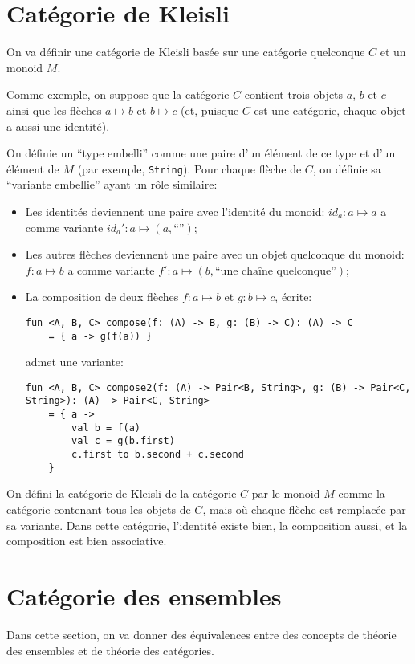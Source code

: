 \documentclass[a4paper,10pt,french,openany]{memoir}
\begin{document}
\section{Catégorie de Kleisli}

On va définir une catégorie de Kleisli basée sur une catégorie quelconque $C$ et un monoid $M$.

Comme exemple, on suppose que la catégorie $C$ contient trois objets $a$, $b$ et $c$ ainsi que les flèches $a \mapsto b$ et $b \mapsto c$ (et, puisque $C$ est une catégorie, chaque objet a aussi une identité).

On définie un ``type embelli'' comme une paire d'un élément de ce type et d'un élément de $M$ (par exemple, \lstinline{String}).
Pour chaque flèche de $C$, on définie sa ``variante embellie'' ayant un rôle similaire:
\begin{itemize}
 \item Les identités deviennent une paire avec l'identité du monoid: $id_a: a \mapsto a$ a comme variante $id_a': a \mapsto (a, \text{``''})$;
 \item Les autres flèches deviennent une paire avec un objet quelconque du monoid: $f: a \mapsto b$ a comme variante $f': a \mapsto (b, \text{``une chaîne quelconque''})$;
 \item La composition de deux flèches $f: a \mapsto b$ et $g: b \mapsto c$, écrite:
\begin{lstlisting}
fun <A, B, C> compose(f: (A) -> B, g: (B) -> C): (A) -> C
    = { a -> g(f(a)) }
\end{lstlisting}
       admet une variante:
\begin{lstlisting}
fun <A, B, C> compose2(f: (A) -> Pair<B, String>, g: (B) -> Pair<C, String>): (A) -> Pair<C, String>
    = { a ->
        val b = f(a)
        val c = g(b.first)
        c.first to b.second + c.second
    }
\end{lstlisting}
\end{itemize}

On défini la catégorie de Kleisli de la catégorie $C$ par le monoid $M$ comme la catégorie contenant tous les objets de $C$, mais où chaque flèche est remplacée par sa variante. Dans cette catégorie, l'identité existe bien, la composition aussi, et la composition est bien associative.

\section{Catégorie des ensembles}
Dans cette section, on va donner des équivalences entre des concepts de théorie des ensembles et de théorie des catégories.
\end{document}
